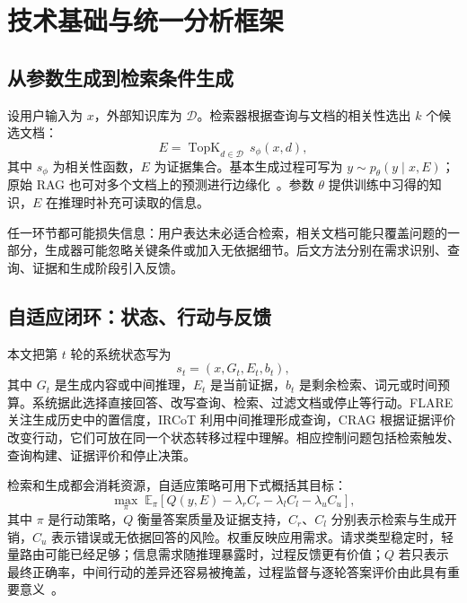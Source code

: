 \section{技术基础与统一分析框架}
\label{sec:foundations}

\subsection{从参数生成到检索条件生成}

设用户输入为 $x$，外部知识库为 $\mathcal D$。检索器根据查询与文档的相关性选出 $k$ 个候选文档：
\begin{equation}
 E=\operatorname{TopK}_{d\in\mathcal D}\,s_{\phi}(x,d),
 \label{eq:retrieval}
\end{equation}
其中 $s_{\phi}$ 为相关性函数，$E$ 为证据集合。基本生成过程可写为 $y\sim p_{\theta}(y\mid x,E)$；原始 RAG 也可对多个文档上的预测进行边缘化~\citep{lewis2020rag}。参数 $\theta$ 提供训练中习得的知识，$E$ 在推理时补充可读取的信息。

任一环节都可能损失信息：用户表达未必适合检索，相关文档可能只覆盖问题的一部分，生成器可能忽略关键条件或加入无依据细节。后文方法分别在需求识别、查询、证据和生成阶段引入反馈。

\subsection{自适应闭环：状态、行动与反馈}

本文把第 $t$ 轮的系统状态写为
\begin{equation}
 s_t=(x,G_t,E_t,b_t),
 \label{eq:state}
\end{equation}
其中 $G_t$ 是生成内容或中间推理，$E_t$ 是当前证据，$b_t$ 是剩余检索、词元或时间预算。系统据此选择直接回答、改写查询、检索、过滤文档或停止等行动。FLARE 关注生成历史中的置信度，IRCoT 利用中间推理形成查询，CRAG 根据证据评价改变行动，它们可放在同一个状态转移过程中理解。相应控制问题包括检索触发、查询构建、证据评价和停止决策。

检索和生成都会消耗资源，自适应策略可用下式概括其目标：
\begin{equation}
 \max_{\pi}\; \mathbb E_{\pi}\left[Q(y,E)-\lambda_r C_r-\lambda_l C_l-\lambda_u C_u\right],
 \label{eq:objective}
\end{equation}
其中 $\pi$ 是行动策略，$Q$ 衡量答案质量及证据支持，$C_r$、$C_l$ 分别表示检索与生成开销，$C_u$ 表示错误或无依据回答的风险。权重反映应用需求。请求类型稳定时，轻量路由可能已经足够；信息需求随推理暴露时，过程反馈更有价值；$Q$ 若只表示最终正确率，中间行动的差异还容易被掩盖，过程监督与逐轮答案评价由此具有重要意义~\citep{xiong2026process,tian2026partial}。
